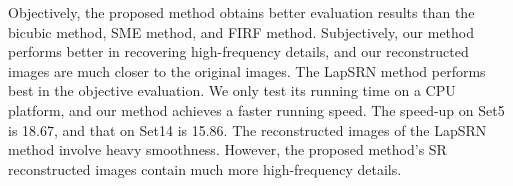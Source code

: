 \documentclass[review,numbers,sort&compress]{elsarticle}  %
\begin{document}
Objectively, the proposed method obtains better evaluation results than the bicubic method, SME method, and FIRF method. Subjectively, our method performs better in recovering high-frequency details, and our reconstructed images are much closer to the original images. The LapSRN method performs best in the objective evaluation. We only test its running time on a CPU platform, and our method achieves a faster running speed. The speed-up on Set5 is 18.67, and that on Set14 is 15.86. The reconstructed images of the LapSRN method involve heavy smoothness. However, the proposed method’s SR reconstructed images contain much more high-frequency details.
\begin{figure}[htbp]
    \centering
\end{figure}
\end{document}
